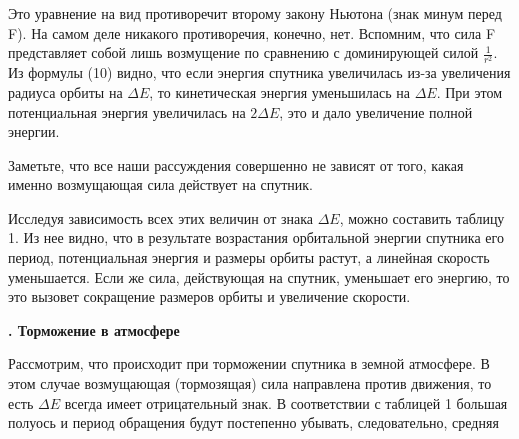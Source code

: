\begin{multicols}{2}
\hspace{1.5em}Это уравнение на вид противоречит второму закону Ньютона (знак минум перед F). На самом деле никакого противоречия, конечно, нет. Вспомним, что сила F представляет собой лишь возмущение по сравнению с доминирующей силой $\frac{1}{r^2}$. Из формулы (10) видно, что если энергия спутника увеличилась из-за увеличения радиуса орбиты на $\Delta E$, то кинетическая энергия уменьшилась на $\Delta E$. При этом потенциальная энергия увеличилась на $2\Delta E$, это и дало увеличение полной энергии.

\hspace{1.5em}Заметьте, что все наши рассуждения совершенно не зависят от того, какая именно возмущающая сила действует на спутник.

\hspace{1.5em}Исследуя зависимость всех этих величин от знака $\Delta E$, можно составить таблицу 1. Из нее видно, что в результате возрастания орбитальной энергии спутника его период, потенциальная энергия и размеры орбиты растут, а линейная скорость уменьшается. Если же сила, действующая на спутник, уменьшает его энергию, то это вызовет сокращение размеров орбиты и увеличение скорости.

\begin{center}
    \textbf{. Торможение в атмосфере}
\end{center}
\hspace{1.5em}Рассмотрим, что происходит при торможении спутника в земной атмосфере. В этом случае возмущающая (тормозящая) сила направлена против движения, то есть $\Delta E$ всегда имеет отрицательный знак. В соответствии с таблицей 1 большая полуось и период обращения будут постепенно убывать, следовательно, средняя
\vfill
\end{multicols}
